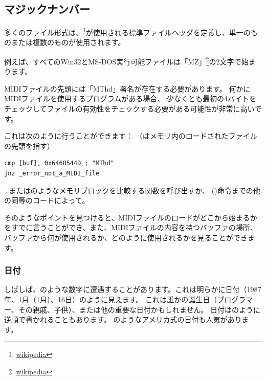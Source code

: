 \subsection{マジックナンバー}
\label{magic_numbers}

\newcommand{\FNURLMAGIC}{\footnote{\href{http://go.yurichev.com/17112}{wikipedia}}}

多くのファイル形式は、\FNURLMAGIC{}が使用される標準ファイルヘッダを定義し、単一のものまたは複数のものが使用されます。


例えば、すべてのWin32とMS-DOS実行可能ファイルは「MZ」\footnote{\href{http://go.yurichev.com/17113}{wikipedia}}の2文字で始まります。


MIDIファイルの先頭には「MThd」署名が存在する必要があります。
何かにMIDIファイルを使用するプログラムがある場合、
少なくとも最初の4バイトをチェックしてファイルの有効性をチェックする必要がある可能性が非常に高いです。

これは次のように行うことができます：
（はメモリ内のロードされたファイルの先頭を指す）

\begin{lstlisting}[style=customasmx86]
cmp [buf], 0x6468544D ; "MThd"
jnz _error_not_a_MIDI_file
\end{lstlisting}


\dots またはのようなメモリブロックを比較する関数を呼び出すか、 ()命令までの他の同等のコードによって。

そのようなポイントを見つけると、MIDIファイルのロードがどこから始まるかをすでに言うことができ、また、MIDIファイルの内容を持つバッファの場所、バッファから何が使用されるか、どのように使用されるかを見ることができます。

\subsubsection{日付}


しばしば、のような数字に遭遇することがあります。これは明らかに日付（1987年、1月（1月）、16日）のように見えます。
これは誰かの誕生日（プログラマー、その親戚、子供）、または他の重要な日付かもしれません。
日付はのように逆順で書かれることもあります。
のようなアメリカ式の日付も人気があります。

